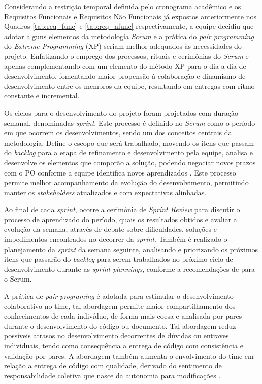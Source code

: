 \documentclass[
    12pt,               %
    openright,          %
    oneside,
    a4paper,            %
    BIBLATEX,           %
    TODO,               %
    english,            %
    brazil              %
    ]{ifsp-spo-inf-ctds}
\begin{document}
        Considerando a restrição temporal definida pelo cronograma acadêmico e os Requisitos Funcionais e Requisitos Não Funcionais já expostos anteriormente nos Quadros \ref{tab:req_func} e \ref{tab:req_nfunc} respectivamente, a equipe decidiu que adotar alguns elementos da metodologia \emph{Scrum}  e a prática do \emph{pair programming} do \emph{Extreme Programming} (XP)  seriam melhor adequados às necessidades do projeto. Enfatizando o emprego dos processos, rituais e cerimônias do \emph{Scrum} e apenas complementando com um elemento do método XP para o dia a dia de desenvolvimento, fomentando maior propensão à colaboração e dinamismo de desenvolvimento entre os membros da equipe, resultando em entregas com ritmo constante e incremental.
        
        
        Os ciclos para o desenvolvimento do projeto foram projetados com duração semanal, denominadas \emph{sprint}. Este processo é definido no \emph{Scrum} como o período em que ocorrem os desenvolvimentos, sendo um dos conceitos centrais da metodologia. Define o escopo que será trabalhado, movendo os itens que passam do \emph{backlog} para a etapa de refinamento e desenvolvimento pela equipe, analisa e desenvolve os elementos que comporão a solução, podendo negociar novos prazos com o PO conforme a equipe identifica novos aprendizados . Este processo permite melhor acompanhamento da evolução do desenvolvimento, permitindo manter os \emph{stakeholders} atualizados e com expectativas alinhadas.
        
        Ao final de cada \emph{sprint}, ocorre a cerimônia de \emph{Sprint Review} para discutir o processo de aprendizado do período, quais os resultados obtidos e avaliar a evolução da semana, através de debate sobre dificuldades, soluções e impedimentos encontrados no decorrer da \emph{sprint}. Também é realizado o planejamento da \emph{sprint} da semana seguinte, analisando e priorizando os próximos itens que passarão do \emph{backlog} para serem trabalhados no próximo ciclo de desenvolvimento durante as \emph{sprint plannings}, conforme a recomendações de  para o Scrum.
        
        A prática de \emph{pair programing} é adotada para estimular o desenvolvimento colaborativo no time, tal abordagem permite maior compartilhamento dos conhecimentos de cada indivíduo, de forma mais coesa e analisada por pares durante o desenvolvimento do código ou documento. Tal abordagem reduz possíveis atrasos no desenvolvimento decorrentes de dúvidas ou entraves individuais, tendo como consequência a entrega de código com consistência e validação por pares. A abordagem também aumenta o envolvimento do time em relação a entrega de código com qualidade, derivado do sentimento de responsabilidade coletiva que nasce da autonomia para modificações .
\end{document}
